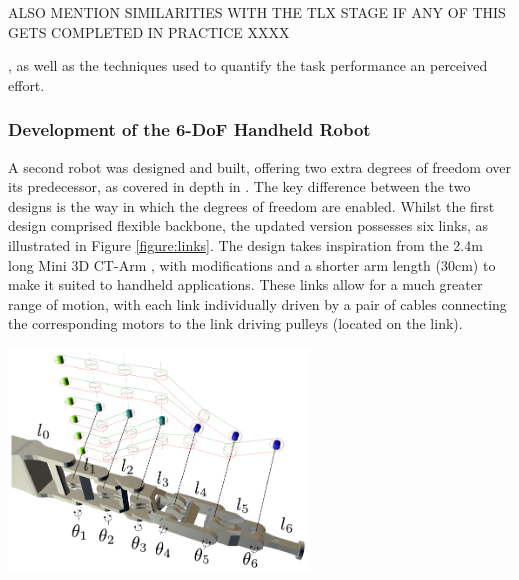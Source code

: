 \documentclass[11pt]{article}
\begin{document}
ALSO MENTION SIMILARITIES WITH THE TLX STAGE IF ANY OF THIS GETS COMPLETED IN PRACTICE XXXX

 , as well as the techniques used to quantify the task performance an perceived effort. 



\subsubsection{Development of the 6-DoF Handheld Robot}

A second robot was designed and built, offering two extra degrees of freedom over its predecessor, as covered in depth in \cite{GreggSmithKinematics}. The key difference between the two designs is the way in which the degrees of freedom are enabled. Whilst the first design comprised flexible backbone, the updated version possesses six links, as illustrated in Figure \ref{figure:links}. The design takes inspiration from the 2.4m long Mini 3D CT-Arm \cite{Horigome2014}, with modifications and a shorter arm length (30cm) to make it suited to handheld applications. These links allow for a much greater range of motion, with each link individually driven by a pair of cables connecting the corresponding motors to the link driving pulleys (located on the link).

\begin{center}
\includegraphics[width = 0.6\textwidth]{links.png}
\label{figure:links}
\end{center}
\end{document}
